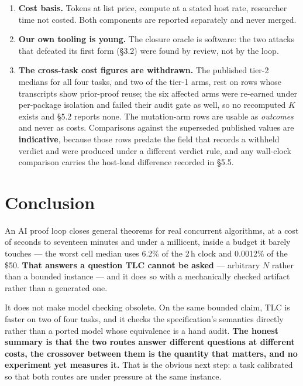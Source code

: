 \documentclass[11pt,a4paper]{article}
\begin{document}
\begin{enumerate}
\item \textbf{Cost basis.} Tokens at list price, compute at a stated host rate, researcher time not
      costed. Both components are reported separately and never merged.
\item \textbf{Our own tooling is young.} The closure oracle is software: the two attacks that defeated
      its first form (\S3.2) were found by review, not by the loop.
\item \textbf{The cross-task cost figures are withdrawn.} The published tier-2 medians for all four
      tasks, and two of the tier-1 arms, rest on rows whose transcripts show prior-proof reuse; the six
      affected arms were re-earned under per-package isolation and failed their audit gate as well, so no
      recomputed $K$ exists and \S5.2 reports none. The mutation-arm rows are usable as \emph{outcomes}
      and never as costs. Comparisons against the superseded published values are \textbf{indicative},
      because those rows predate the field that records a withheld verdict and were produced under a
      different verdict rule, and any wall-clock comparison carries the host-load difference recorded in
      \S5.5.
\end{enumerate}

\section{Conclusion}

An AI proof loop closes general theorems for real concurrent algorithms, at a cost of seconds to
seventeen minutes and under a millicent, inside a budget it barely touches --- the worst cell median
uses 6.2\% of the 2\,h clock and 0.0012\% of the \$50. \textbf{That answers a question TLC cannot be
asked} --- arbitrary $N$ rather than a bounded instance --- and it does so with a mechanically checked
artifact rather than a generated one.

It does not make model checking obsolete. On the same bounded claim, TLC is faster on two of four
tasks, and it checks the specification's semantics directly rather than a ported model whose
equivalence is a hand audit. \textbf{The honest summary is that the two routes answer different
questions at different costs, the crossover between them is the quantity that matters, and no
experiment yet measures it.} That is the obvious next step: a task calibrated so that both routes are
under pressure at the same instance.
\end{document}
